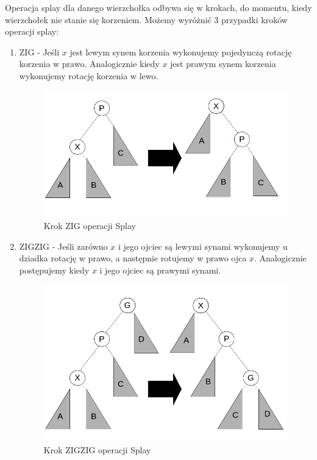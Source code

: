 \documentclass[declaration,shortabstract]{iithesis}
\theoremstyle{thm}
\theoremstyle{remark}
\theoremstyle{plain}
\theoremstyle{plain}
\theoremstyle{plain}
\begin{document}
Operacja splay dla danego wierzchołka odbywa się w krokach, do momentu, kiedy wierzchołek nie stanie się korzeniem. Możemy wyróżnić 3 przypadki kroków operacji splay: \begin{enumerate}  

\item{ZIG - Jeśli $x$ jest lewym synem korzenia wykonujemy pojedynczą rotację korzenia w prawo. Analogicznie kiedy $x$ jest prawym synem korzenia wykonujemy rotację korzenia w lewo.\\  
\begin{figure}[H]
\centering
\includegraphics[scale = 0.3]{zig.png}  
\caption{Krok ZIG operacji Splay}  
\label{fig:zig} 
\end{figure}}   

\item{ZIGZIG - Jeśli zarówno $x$ i jego ojciec są lewymi synami wykonujemy u dziadka rotację w prawo, a następnie rotujemy w prawo ojca $x$. Analogicznie postępujemy kiedy $x$ i jego ojciec są prawymi synami.\\  

\begin{figure}[H]  
\centering
    \includegraphics[scale = 0.3]{zigzig.png}
      \caption{Krok ZIGZIG operacji Splay}  
      \label{fig:zigzig} 
      \end{figure}}  


\end{enumerate}
\end{document}
